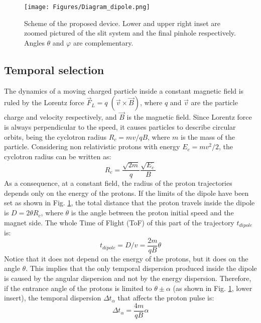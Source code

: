 \documentclass{cup-hpl}
\begin{document}
\begin{figure}
	\centering
		\texttt{[image: Figures/Diagram\_dipole.png]}%
	\caption{Scheme of the proposed device. Lower and upper right inset are zoomed pictured of the slit system and the final pinhole respectively. Angles $\theta$ and $\varphi$ are complementary.}
\label{Dipole diagram}
\end{figure}

\subsection{Temporal selection}
The dynamics of a moving charged particle inside a constant magnetic field is ruled by the Lorentz force $\vec{F}_L = q \; (\vec{v} \times \vec{B})$, where $q$ and $\vec{v}$ are the particle charge and velocity respectively, and $\vec{B}$ is the magnetic field. Since Lorentz force is always perpendicular to the speed, it causes particles to describe circular orbits, being the  cyclotron radius $ R_c = m v / q B$, where $m$ is the mass of the particle. Considering non relativistic protons with energy $E_c = m v^2 /2$, the cyclotron radius can be written as:
\begin{equation}
R_c =\frac{\sqrt{2 m}}{q} \frac{\sqrt{E_c}}{B}
\label{Equation: radius}
\end{equation}
As a consequence, at a constant field, the radius of the proton trajectories depends only on the energy of the protons.
If the limits of the dipole have been set as shown in Fig. \ref{Dipole diagram}, the total distance that the proton travels inside the dipole is $D = 2 \theta R_c$, where $\theta$ is the angle between the proton initial speed and the magnet side. The whole Time of Flight (ToF) of this part of the trajectory $t_{dipole}$ is:
\begin{equation}
t_{dipole} = D/v = \frac{2 m }{q B} \theta
\label{Eq: Time of flight}
\end{equation}
Notice that it does not depend on the energy of the protons, but it does on the angle $\theta$. This implies that the only temporal dispersion produced inside the dipole is caused by the angular dispersion and not by the energy dispersion. Therefore, if the entrance angle of the protons is limited to $ \theta \pm \alpha$ (as shown in Fig. \ref{Dipole diagram}, lower insert), the temporal dispersion $\Delta t_{\alpha}$  that affects the proton pulse is:
\begin{equation}
\Delta t_{\alpha} = \frac{4m}{q B} \alpha
\label{Eq: Angular time dispersion}
\end{equation}
\end{document}
